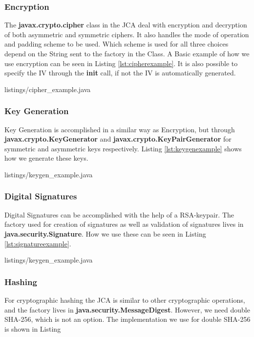 \documentclass[pdftex,english,10pt,b5paper,twoside]{book}
\begin{document}
\subsubsection{Encryption} 

The {\bf javax.crypto.cipher} class in the \ac{JCA} deal with encryption and
decryption of both asymmetric and symmetric ciphers.  It also handles the mode
of operation and padding scheme to be used. Which scheme is used for all three
choices depend on the String sent to the factory in the Class. A Basic example
of how we use encryption can be seen in Listing \ref{lst:cipherexample}. It is
also possible to specify the \ac{IV} through the {\bf init} call, if not the
\ac{IV} is automatically generated.


{listings/cipher_example.java}

\subsubsection{Key Generation}
Key Generation is accomplished in a similar way as Encryption, but through {\bf
javax.crypto.KeyGenerator} and {\bf javax.crypto.KeyPairGenerator} for
symmetric and asymmetric keys respectively. Listing \ref{lst:keygenexample}
shows how we generate these keys.


{listings/keygen_example.java}

\subsubsection{Digital Signatures}
Digital Signatures can be accomplished with the help of a \ac{RSA}-keypair. The
factory used for creation of signatures as well as validation of signatures
lives in {\bf java.security.Signature}. How we use these can be seen in Listing 
\ref{lst:signatureexample}.


{listings/keygen_example.java}

\subsubsection{Hashing} For cryptographic hashing the \ac{JCA} is similar to
other cryptographic operations, and the factory lives in {\bf
java.security.MessageDigest}. However, we need double \ac{SHA}-256, which is
not an option. The implementation we use for double \ac{SHA}-256 is shown in
Listing 
\end{document}
